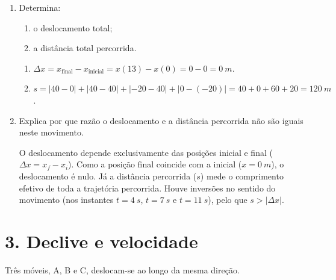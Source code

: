 \documentclass[11pt,a4paper]{article}
\begin{document}
\begin{enumerate}[label=\textbf{\arabic*.}]
		\item Determina:
		
		\begin{enumerate}[label=\alph*)]
			\item o deslocamento total;
			\item a distância total percorrida.
		\end{enumerate}
		
		\begin{solucao}
			\begin{enumerate}[label=\alph*)]
				\item $\Delta x = x_{\text{final}} - x_{\text{inicial}} = x(13) - x(0) = 0 - 0 = \SI{0}{m}$.
				\item $s = |40 - 0| + |40 - 40| + |-20 - 40| + |0 - (-20)| = 40 + 0 + 60 + 20 = \SI{120}{m}$.
			\end{enumerate}
		\end{solucao}
		
		\item Explica por que razão o deslocamento e a distância percorrida não são
		iguais neste movimento.
		
		\begin{solucao}
			O deslocamento depende exclusivamente das posições inicial e final ($\Delta x = x_f - x_i$). Como a posição final coincide com a inicial ($x = \SI{0}{m}$), o deslocamento é nulo. Já a distância percorrida ($s$) mede o comprimento efetivo de toda a trajetória percorrida. Houve inversões no sentido do movimento (nos instantes $t = \SI{4}{s}$, $t = \SI{7}{s}$ e $t = \SI{11}{s}$), pelo que $s > |\Delta x|$.
		\end{solucao}
		
	\end{enumerate}
	
	\section*{3. Declive e velocidade}
	
	Três móveis, A, B e C, deslocam-se ao longo da mesma direção.
	
\end{document}
